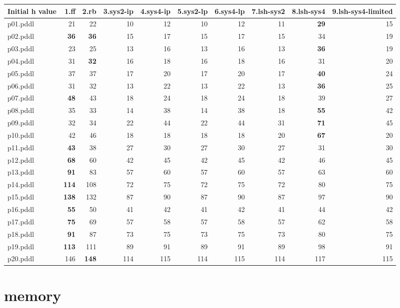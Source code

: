 \documentclass{article}
\begin{document}
\begin{tabular}{@{}lrrrrrrrrr@{}}
Initial h value & 1.ff & 2.rb & 3.sys2-ip & 4.sys4-ip & 5.sys2-lp & 6.sys4-lp & 7.lsh-sys2 & 8.lsh-sys4 & 9.lsh-sys4-limited \\
\midrule
p01.pddl & 21 & 22 & 10 & 12 & 10 & 12 & 11 & \textbf{29} & 15 \\
p02.pddl & \textbf{36} & \textbf{36} & 15 & 17 & 15 & 17 & 15 & 34 & 19 \\
p03.pddl & 23 & 25 & 13 & 16 & 13 & 16 & 13 & \textbf{36} & 19 \\
p04.pddl & 31 & \textbf{32} & 16 & 18 & 16 & 18 & 16 & 31 & 20 \\
p05.pddl & 37 & 37 & 17 & 20 & 17 & 20 & 17 & \textbf{40} & 24 \\
p06.pddl & 31 & 32 & 13 & 22 & 13 & 22 & 13 & \textbf{36} & 25 \\
p07.pddl & \textbf{48} & 43 & 18 & 24 & 18 & 24 & 18 & 39 & 27 \\
p08.pddl & 35 & 33 & 14 & 38 & 14 & 38 & 18 & \textbf{55} & 42 \\
p09.pddl & 32 & 34 & 22 & 44 & 22 & 44 & 31 & \textbf{71} & 45 \\
p10.pddl & 42 & 46 & 18 & 18 & 18 & 18 & 20 & \textbf{67} & 20 \\
p11.pddl & \textbf{43} & 38 & 27 & 30 & 27 & 30 & 27 & 31 & 30 \\
p12.pddl & \textbf{68} & 60 & 42 & 45 & 42 & 45 & 42 & 46 & 45 \\
p13.pddl & \textbf{91} & 83 & 57 & 60 & 57 & 60 & 57 & 63 & 60 \\
p14.pddl & \textbf{114} & 108 & 72 & 75 & 72 & 75 & 72 & 80 & 75 \\
p15.pddl & \textbf{138} & 132 & 87 & 90 & 87 & 90 & 87 & 97 & 90 \\
p16.pddl & \textbf{55} & 50 & 41 & 42 & 41 & 42 & 41 & 44 & 42 \\
p17.pddl & \textbf{75} & 69 & 57 & 58 & 57 & 58 & 57 & 62 & 58 \\
p18.pddl & \textbf{91} & 87 & 73 & 75 & 73 & 75 & 73 & 80 & 75 \\
p19.pddl & \textbf{113} & 111 & 89 & 91 & 89 & 91 & 89 & 98 & 91 \\
p20.pddl & 146 & \textbf{148} & 114 & 115 & 114 & 115 & 114 & 117 & 115 \\
\end{tabular}

\hypertarget{memory}{}
\section*{memory}
\end{document}
